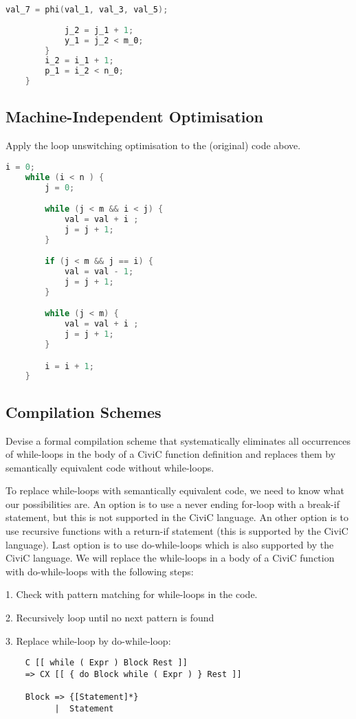 \documentclass[hidelinks]{uva-inf-article}
\begin{document}
\begin{flushleft}
\begin{lstlisting}[basicstyle=\small, language=C, label=lst:code, caption=Static Single Assignment Form (SSA), captionpos=b]
            val_7 = phi(val_1, val_3, val_5);
    
            j_2 = j_1 + 1;
            y_1 = j_2 < m_0;
        }
        i_2 = i_1 + 1;
        p_1 = i_2 < n_0;
    }
\end{lstlisting}    

\subsection{Machine-Independent Optimisation}
Apply the loop unswitching optimisation to the (original) code above.

\begin{lstlisting}[basicstyle=\small, language=C, label=lst:code, caption=Loop unswitching optimisation, captionpos=b]
    i = 0;
    while (i < n ) {
        j = 0;

        while (j < m && i < j) {
            val = val + i ;
            j = j + 1;
        }

        if (j < m && j == i) { 
            val = val - 1;
            j = j + 1;
        }

        while (j < m) {
            val = val + i ;
            j = j + 1;
        }

        i = i + 1;
    }
\end{lstlisting}    

\subsection{Compilation Schemes}
Devise a formal compilation scheme that systematically eliminates all occurrences of
while-loops in the body of a CiviC function definition and replaces them by semantically 
equivalent code without while-loops.

To replace while-loops with semantically equivalent code, we need to know what our possibilities
are. An option is to use a never ending for-loop with a break-if statement, but this is not supported
in the CiviC language. An other option is to use recursive functions with a return-if statement (this
 is supported by the CiviC language). Last option is to use do-while-loops which is also supported 
by the CiviC language.
We will replace the while-loops in a body of a CiviC function with do-while-loops with the following
steps:

1. Check with pattern matching for while-loops in the code.

2. Recursively loop until no next pattern is found

3. Replace while-loop by do-while-loop:


\begin{lstlisting}
    C [[ while ( Expr ) Block Rest ]]
    => CX [[ { do Block while ( Expr ) } Rest ]]

    Block => {[Statement]*}
          |  Statement
\end{lstlisting}


\end{flushleft}
\end{document}
